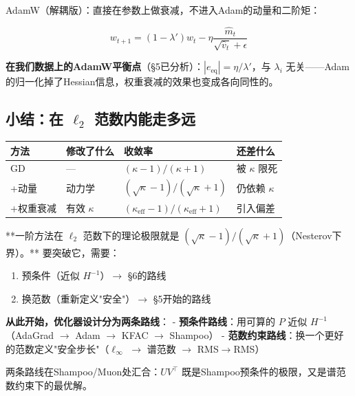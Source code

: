 \documentclass[12pt,a4paper]{article}
\begin{document}
AdamW（解耦版）：直接在参数上做衰减，不进入Adam的动量和二阶矩：


\[w_{t+1} = (1-\lambda')w_t - \eta\frac{\hat{m}_t}{\sqrt{\hat{v}_t}+\epsilon}\]

\textbf{在我们数据上的AdamW平衡点}（§5已分析）：$|e_{\text{eq}}| = \eta/\lambda'$，与 $\lambda_i$ 无关——Adam的归一化掉了Hessian信息，权重衰减的效果也变成各向同性的。


\subsection{小结：在 $\ell_2$ 范数内能走多远}






\begin{center}\small
\begin{longtable}{|l|l|l|l|}
\hline
方法 & 修改了什么 & 收敛率 & 还差什么 \\
\hline
GD & — & $(\kappa-1)/(\kappa+1)$ & 被 $\kappa$ 限死 \\
+动量 & 动力学 & $(\sqrt\kappa-1)/(\sqrt\kappa+1)$ & 仍依赖 $\kappa$ \\
+权重衰减 & 有效 $\kappa$ & $(\kappa_{\text{eff}}-1)/(\kappa_{\text{eff}}+1)$ & 引入偏差 \\
\hline
\end{longtable}
\end{center}


**一阶方法在 $\ell_2$ 范数下的理论极限就是 $(\sqrt\kappa-1)/(\sqrt\kappa+1)$（Nesterov下界）。** 要突破它，需要：
\begin{enumerate}[leftmargin=*,nosep]
\item 预条件（近似 $H^{-1}$）$\to$ §6的路线
\item 换范数（重新定义"安全"）$\to$ §5开始的路线
\end{enumerate}






\begin{insightbox}
\textbf{从此开始，优化器设计分为两条路线}：
- \textbf{预条件路线}：用可算的 $P$ 近似 $H^{-1}$（AdaGrad $\to$ Adam $\to$ KFAC $\to$ Shampoo）
- \textbf{范数约束路线}：换一个更好的范数定义"安全步长"（$\ell_\infty$ $\to$ 谱范数 $\to$ RMS$\to$RMS）

两条路线在Shampoo/Muon处汇合：$UV^\top$ 既是Shampoo预条件的极限，又是谱范数约束下的最优解。
\end{insightbox}
\end{document}
